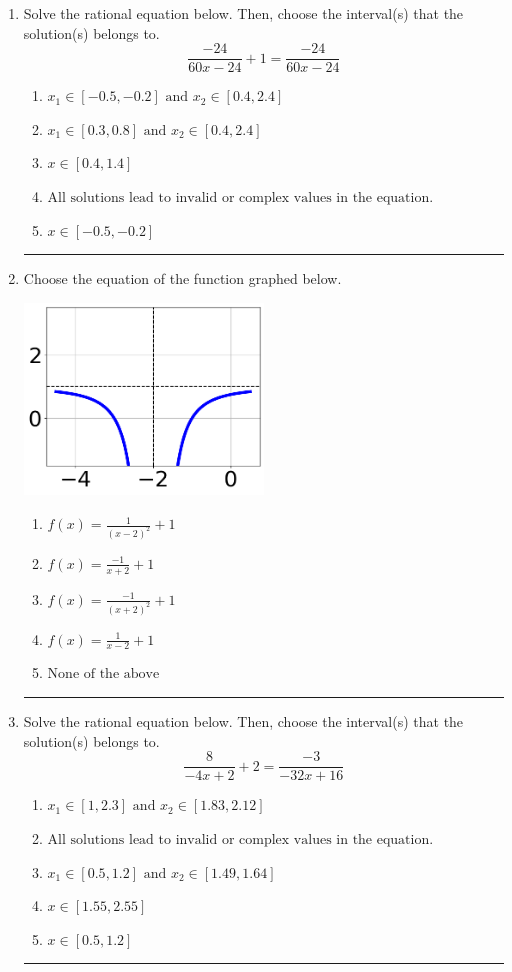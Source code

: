 \documentclass[14pt]{extbook}
\newcommand{\litem}[1]{\item#1\hspace*{-1cm}\rule{\textwidth}{0.4pt}}
\begin{document}
\begin{enumerate}
{\begin{enumerate}[label=\Alph*.]
\end{enumerate} }
\litem{
Solve the rational equation below. Then, choose the interval(s) that the solution(s) belongs to.\[ \frac{-24}{60x -24} + 1 = \frac{-24}{60x -24} \]\begin{enumerate}[label=\Alph*.]
\item \( x_1 \in [-0.5, -0.2] \text{ and } x_2 \in [0.4,2.4] \)
\item \( x_1 \in [0.3, 0.8] \text{ and } x_2 \in [0.4,2.4] \)
\item \( x \in [0.4,1.4] \)
\item \( \text{All solutions lead to invalid or complex values in the equation.} \)
\item \( x \in [-0.5,-0.2] \)

\end{enumerate} }
\litem{
Choose the equation of the function graphed below.
\begin{center}
    \includegraphics[width=0.5\textwidth]{../Figures/rationalGraphToEquationCopyC.png}
\end{center}
\begin{enumerate}[label=\Alph*.]
\item \( f(x) = \frac{1}{(x - 2)^2} + 1 \)
\item \( f(x) = \frac{-1}{x + 2} + 1 \)
\item \( f(x) = \frac{-1}{(x + 2)^2} + 1 \)
\item \( f(x) = \frac{1}{x - 2} + 1 \)
\item \( \text{None of the above} \)

\end{enumerate} }
\litem{
Solve the rational equation below. Then, choose the interval(s) that the solution(s) belongs to.\[ \frac{8}{-4x + 2} + 2 = \frac{-3}{-32x + 16} \]\begin{enumerate}[label=\Alph*.]
\item \( x_1 \in [1, 2.3] \text{ and } x_2 \in [1.83,2.12] \)
\item \( \text{All solutions lead to invalid or complex values in the equation.} \)
\item \( x_1 \in [0.5, 1.2] \text{ and } x_2 \in [1.49,1.64] \)
\item \( x \in [1.55,2.55] \)
\item \( x \in [0.5,1.2] \)


\end{enumerate}}
\end{enumerate}
\end{document}
